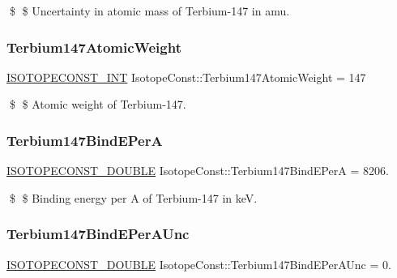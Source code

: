 \$ \$ Uncertainty in atomic mass of Terbium-\/147 in amu. \mbox{\label{group___isotope_const-_terbium-_tb147_ga75708c173086e94db6e2056cbc14c6d2}} 
\subsubsection{\texorpdfstring{Terbium147\+Atomic\+Weight}{Terbium147AtomicWeight}}
{\footnotesize\ttfamily \mbox{\hyperlink{group___isotope_const-_macros_ga5f18360b3e99483a35c32d789e62621c}{I\+S\+O\+T\+O\+P\+E\+C\+O\+N\+S\+T\+\_\+\+I\+NT}} Isotope\+Const\+::\+Terbium147\+Atomic\+Weight = 147}

\$ \$ Atomic weight of Terbium-\/147. \mbox{\label{group___isotope_const-_terbium-_tb147_gab6a6de67411f3c7e118c42fee71ce5e8}} 
\subsubsection{\texorpdfstring{Terbium147\+Bind\+E\+PerA}{Terbium147BindEPerA}}
{\footnotesize\ttfamily \mbox{\hyperlink{group___isotope_const-_macros_ga8f45a7272ce02c0b4c65c44636ed719a}{I\+S\+O\+T\+O\+P\+E\+C\+O\+N\+S\+T\+\_\+\+D\+O\+U\+B\+LE}} Isotope\+Const\+::\+Terbium147\+Bind\+E\+PerA = 8206.}

\$ \$ Binding energy per A of Terbium-\/147 in keV. \mbox{\label{group___isotope_const-_terbium-_tb147_gac78c50514c397989cf37bac75b52f918}} 
\subsubsection{\texorpdfstring{Terbium147\+Bind\+E\+Per\+A\+Unc}{Terbium147BindEPerAUnc}}
{\footnotesize\ttfamily \mbox{\hyperlink{group___isotope_const-_macros_ga8f45a7272ce02c0b4c65c44636ed719a}{I\+S\+O\+T\+O\+P\+E\+C\+O\+N\+S\+T\+\_\+\+D\+O\+U\+B\+LE}} Isotope\+Const\+::\+Terbium147\+Bind\+E\+Per\+A\+Unc = 0.}

